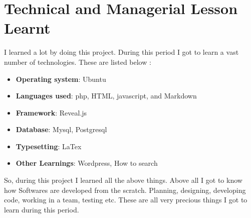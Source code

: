 
\section{Technical and Managerial Lesson Learnt}
I learned a lot by doing this project. During this period I got to learn a vast 
number of technologies. These are listed below :
\begin{itemize}
\item {\bf{Operating system}}: Ubuntu
\item {\bf{Languages used}}: php, HTML, javascript, and Markdown
\item {\bf{Framework}}: Reveal.js
\item {\bf{Database}}: Mysql, Postgresql
\item {\bf{Typesetting}}: LaTex
\item {\bf{Other Learnings}}:  Wordpress, How to search

\end{itemize}

So, during this project I learned all the above things. Above all I got to know 
how Softwares are developed from the scratch. Planning, designing, developing code, 
working in a team, testing etc. These are all very precious things I got to learn 
during this period.  


